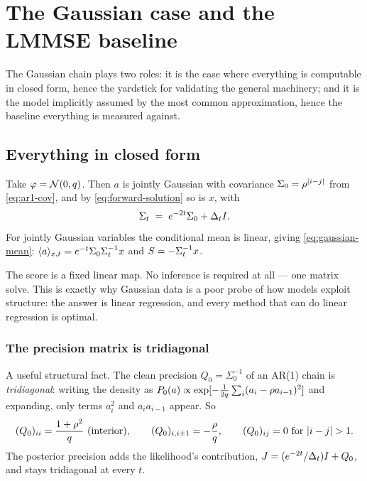 \chapter{The Gaussian case and the LMMSE baseline}
\label{ch:gaussian}

The Gaussian chain plays two roles: it is the case where everything is computable in closed
form, hence the yardstick for validating the general machinery; and it is the model implicitly
assumed by the most common approximation, hence the baseline everything is measured against.

\section{Everything in closed form}

Take $\varphi = \mathcal{N}\!\left(0,q\right)$. Then $a$ is jointly Gaussian with covariance
$\Sigma_0 = \rho^{|i-j|}$ from \eqref{eq:ar1-cov}, and by \eqref{eq:forward-solution} so is
$x$, with
\begin{equation}
\Sigma_t \;=\; e^{-2t}\Sigma_0 + \Delta_t I .
\end{equation}
For jointly Gaussian variables the conditional mean is linear, giving \eqref{eq:gaussian-mean}:
$\langle a \rangle_{x,t} = e^{-t}\Sigma_0\Sigma_t^{-1}x$ and $S = -\Sigma_t^{-1}x$.

\begin{intuition}
The score is a fixed linear map. No inference is required at all --- one matrix solve. This is
exactly why Gaussian data is a poor probe of how models exploit structure: the answer is
linear regression, and every method that can do linear regression is optimal.
\end{intuition}

\subsection{The precision matrix is tridiagonal}

A useful structural fact. The clean precision $Q_0 = \Sigma_0^{-1}$ of an AR(1) chain is
\emph{tridiagonal}: writing the density as
$P_0(a)\propto\exp[-\tfrac{1}{2q}\sum_i (a_i-\rho a_{i-1})^2]$ and expanding, only terms
$a_i^2$ and $a_ia_{i-1}$ appear. So
\[
(Q_0)_{ii} = \frac{1+\corr^2}{\ivar}\ \text{(interior)},
\qquad
(Q_0)_{i,i\pm1} = -\frac{\corr}{\ivar},
\qquad
(Q_0)_{ij}=0 \ \text{for } |i-j|>1 .
\]
The posterior precision adds the likelihood's contribution, $J = (e^{-2t}/\Delta_t)I + Q_0$, and
stays tridiagonal at every $t$.

